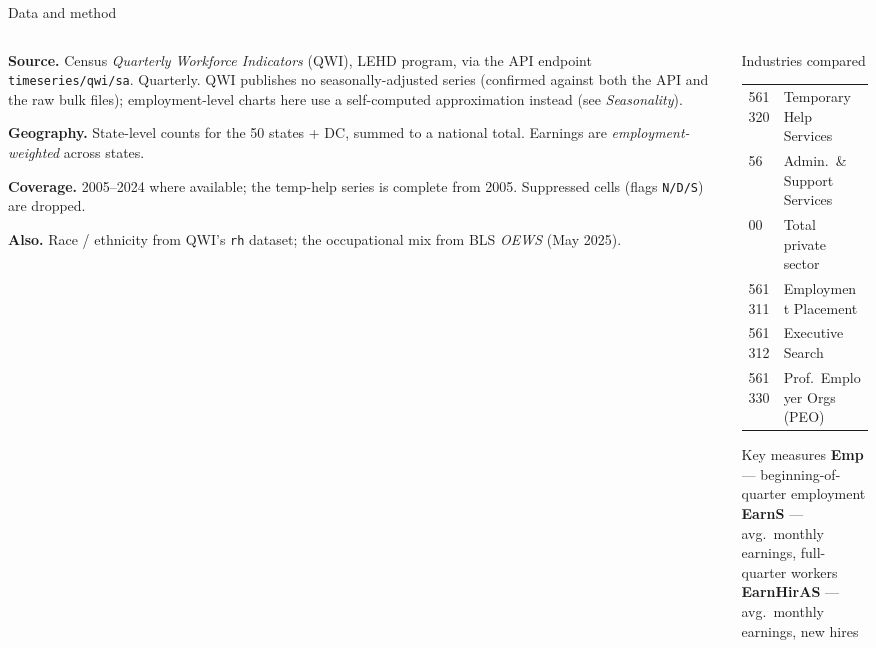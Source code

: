 \documentclass[aspectratio=169,10pt]{beamer}
\begin{document}
\begin{frame}{Data and method}
  \begin{columns}[T]
    \begin{column}{0.54\textwidth}
      \textbf{Source.} Census \emph{Quarterly Workforce Indicators} (QWI), LEHD
      program, via the API endpoint \texttt{timeseries/qwi/sa}. Quarterly.
      QWI publishes no seasonally-adjusted series (confirmed against both the
      API and the raw bulk files); employment-level charts here use a
      self-computed approximation instead (see \emph{Seasonality}).

      \smallskip
      \textbf{Geography.} State-level counts for the 50 states + DC, summed to a
      national total. Earnings are \emph{employment-weighted} across states.

      \smallskip
      \textbf{Coverage.} 2005--2024 where available; the temp-help series is
      complete from 2005. Suppressed cells (flags \texttt{N/D/S}) are dropped.

      \smallskip
      \textbf{Also.} Race / ethnicity from QWI's \texttt{rh} dataset; the
      occupational mix from BLS \emph{OEWS} (May 2025).
    \end{column}
    \begin{column}{0.44\textwidth}
      \begin{block}{Industries compared}
        \footnotesize
        \begin{tabular}{@{}ll@{}}
          \toprule
          561320 & Temporary Help Services \\
          56     & Admin.\ \& Support Services \\
          00     & Total private sector \\
          \midrule
          561311 & Employment Placement \\
          561312 & Executive Search \\
          561330 & Prof.\ Employer Orgs (PEO) \\
          \bottomrule
        \end{tabular}
      \end{block}
      \begin{block}{Key measures}
        \footnotesize
        \textbf{Emp} --- beginning-of-quarter employment\\
        \textbf{EarnS} --- avg.\ monthly earnings, full-quarter workers\\
        \textbf{EarnHirAS} --- avg.\ monthly earnings, new hires
      \end{block}
    \end{column}
  \end{columns}
\end{frame}
\end{document}
